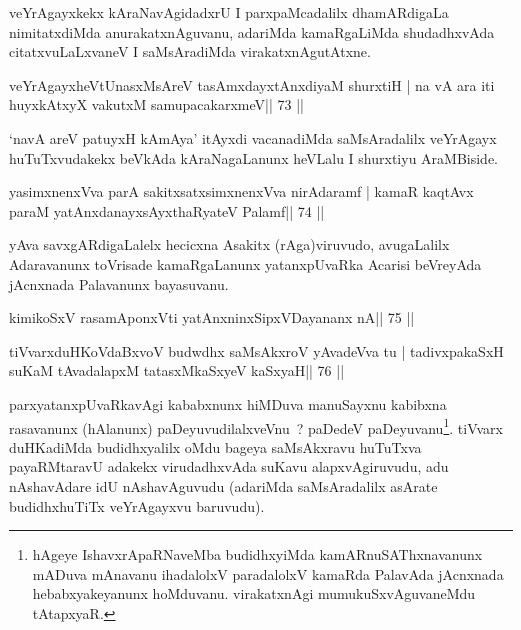 \begin{artha}
veYrAgayxkekx kAraNavAgidadxrU I parxpaMcadalilx dhamARdigaLa nimitatxdiMda anurakatxnAguvanu, adariMda kamaRgaLiMda shudadhxvAda citatxvuLaLxvaneV I saMsAradiMda virakatxnAgutAtxne.
\end{artha}


\begin{shl}
veYrAgayxheVtUnasxMsAreV tasAmxdayxtAnxdiyaM shurxtiH |
na vA ara iti huyxkAtxyX vakutxM samupacakarxmeV\hfill || 73 ||
\end{shl}

\begin{artha}
`navA areV patuyxH kAmAya' itAyxdi vacanadiMda saMsAradalilx veYrAgayx huTuTxvudakekx beVkAda kAraNagaLanunx heVLalu I shurxtiyu AraMBiside.
\end{artha}


\begin{shl}
yasimxnenxVva parA sakitxsatxsimxnenxVva nirAdaramf |
kamaR kaqtAvx paraM yatAnxdanayxsAyxthaRyateV Palamf\hfill || 74 ||
\end{shl}

\begin{artha}
yAva savxgARdigaLalelx hecicxna Asakitx (rAga)viruvudo, avugaLalilx Adaravanunx toVrisade kamaRgaLanunx yatanxpUvaRka Acarisi beVreyAda jAcnxnada Palavanunx bayasuvanu.
\end{artha}


\begin{shl}
kimikoSxV rasamAponxVti yatAnxninxSipxVDayananx nA\hfill || 75 ||
\end{shl}

\begin{shl}
tiVvarxduHKoVdaBxvoV budwdhx saMsAkxroV yAvadeVva tu |
tadivxpakaSxH suKaM tAvadalapxM tatasxMkaSxyeV kaSxyaH\hfill || 76 ||
\end{shl}

\begin{artha}
parxyatanxpUvaRkavAgi kababxnunx hiMDuva manuSayxnu kabibxna
rasavanunx (hAlanunx) paDeyuvudilalxveVnu~? paDedeV
paDeyuvanu\footnote{hAgeye IshavxrApaRNaveMba budidhxyiMda
 kamARnuSAThxnavanunx mADuva mAnavanu ihadalolxV paradalolxV kamaRda
 PalavAda jAcnxnada hebabxyakeyanunx hoMduvanu. virakatxnAgi
 mumukuSxvAguvaneMdu tAtapxyaR.}. tiVvarx duHKadiMda budidhxyalilx
oMdu bageya saMsAkxravu huTuTxva payaRMtaravU adakekx virudadhxvAda
suKavu alapxvAgiruvudu, adu nAshavAdare idU nAshavAguvudu (adariMda
saMsAradalilx asArate budidhxhuTiTx veYrAgayxvu baruvudu).
\end{artha}

